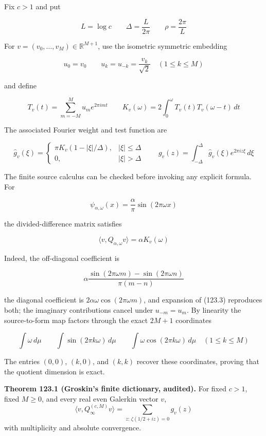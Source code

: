 \documentclass[
  11pt,
]{book}
\renewenvironment{quote}
  {\begin{tcolorbox}[
      enhanced,
      breakable,
      colback=tncream,
      colframe=tnrust,
      boxrule=0.8pt,
      arc=1.5pt,
      left=7pt,
      right=7pt,
      top=6pt,
      bottom=6pt]}
  {\end{tcolorbox}}
\begin{document}
Fix \(c>1\) and put

\[
L=\log c
\qquad
\Delta=\frac{L}{2\pi}
\qquad
\rho=\frac{2\pi}{L}
\tag{123.1}
\]

For \(v=(v_0,\ldots,v_M)\in\mathbb R^{M+1}\), use the isometric
symmetric embedding

\[
u_0=v_0
\qquad
u_k=u_{-k}=\frac{v_k}{\sqrt2}\quad(1\le k\le M)
\tag{123.2}
\]

and define

\[
T_v(t)=\sum_{m=-M}^{M}u_me^{2\pi i mt}
\qquad
K_v(\omega)=2\int_0^\omega T_v(t)T_v(\omega-t)\,dt
\tag{123.3}
\]

The associated Fourier weight and test function are

\[
\widehat g_v(\xi)=
\begin{cases}
\pi K_v(1-|\xi|/\Delta),&|\xi|\le\Delta\\
0,&|\xi|>\Delta
\end{cases}
\qquad
g_v(z)=\int_{-\Delta}^{\Delta}\widehat g_v(\xi)e^{2\pi iz\xi}\,d\xi
\tag{123.4}
\]

The finite source calculus can be checked before invoking any explicit
formula. For

\[
\psi_{\alpha,\omega}(x)=\frac{\alpha}{\pi}\sin(2\pi\omega x)
\]

the divided-difference matrix satisfies

\[
\boxed{\langle v,Q_{\alpha,\omega}v\rangle
=\alpha K_v(\omega)}
\tag{123.5}
\]

Indeed, the off-diagonal coefficient is

\[
\alpha\frac{\sin(2\pi\omega m)-\sin(2\pi\omega n)}
{\pi(m-n)}
\]

the diagonal coefficient is \(2\alpha\omega\cos(2\pi\omega m)\), and
expansion of (123.3) reproduces both; the imaginary contributions cancel
under \(u_{-m}=u_m\). By linearity the source-to-form map factors
through the exact \(2M+1\) coordinates

\[
\int\omega\,d\mu
\qquad
\int\sin(2\pi k\omega)\,d\mu
\qquad
\int\omega\cos(2\pi k\omega)\,d\mu
\quad(1\le k\le M)
\tag{123.6}
\]

The entries \((0,0)\), \((k,0)\), and \((k,k)\) recover these
coordinates, proving that the quotient dimension is exact.

\begin{quote}
\textbf{Theorem 123.1 (Groskin's finite dictionary, audited).} For fixed
\(c>1\), fixed \(M\ge0\), and every real even Galerkin vector \(v\), \[
\boxed{
\langle v,Q_\infty^{(c,M)}v\rangle
=\sum_{z:\,\zeta(1/2+iz)=0}g_v(z)
}
\tag{123.7}
\] with multiplicity and absolute convergence.
\end{quote}
\end{document}

